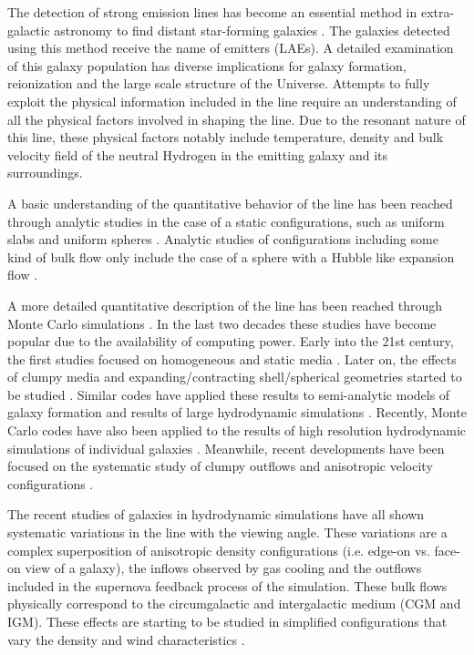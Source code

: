 \documentclass{emulateapj}
\newcommand{\ly}{{\ifmmode{{\rm Ly}\alpha~}\else{Ly$\alpha$~}\fi}}
\begin{document}
The detection of strong \ly emission lines has become an essential
method in extra-galactic astronomy to find distant star-forming
galaxies
\citep{PartridgePeebles,Rhoads00,Gawiser2007,Koehler2007,Ouchi08,Yamada2012,Schenker2012,Finkelstein2013}.
The galaxies detected using this method receive the 
name of \ly emitters (LAEs). 
A detailed examination of this galaxy population has diverse
implications for galaxy formation, reionization and the large scale
structure of the Universe.  
Attempts to fully exploit the physical information included in the \ly
line require an understanding of all the physical factors involved in
shaping the  line. 
Due to the resonant nature of this line, these physical factors
notably include temperature, density and bulk velocity field of the
neutral Hydrogen in the emitting galaxy and its surroundings.


A basic understanding of the quantitative behavior of the \ly line
has been reached through analytic studies in the case of a static
configurations, such as uniform slabs
\citep{Adams72,Harrington73,Neufeld90} and uniform spheres
\citep{Dijkstra06}. 
Analytic studies of configurations including some kind of bulk flow
only include the case of a sphere with a Hubble like expansion flow
\citep{LoebRybicki}.  

A more detailed quantitative description of the \ly line has been
reached through Monte Carlo simulations \citep{Auer68,Avery68,Adams72}. 
In the last two decades these studies have become popular due to the
availability of computing power. 
Early into the 21st century, the first
studies focused on homogeneous and static media
\citep{Ahn00,Ahn01,Zheng02}. 
Later on, the effects of clumpy media \citep{Hansen06} and
expanding/contracting shell/spherical geometries started to be studied
\citep{Ahn03,Verhamme06,Dijkstra06}.  
Similar codes have applied these results to semi-analytic models of
galaxy formation \citep{Orsi12, Garel2012} and results of large
hydrodynamic simulations \citep{CLARA,Forero12,Behrens13}. 
Recently, Monte Carlo codes have also been applied to the results of
high resolution hydrodynamic simulations of individual galaxies
\citep{Laursen09,Barnes11,Verhamme12,Yajima12}. 
Meanwhile, recent  developments have been focused on the systematic
study of clumpy outflows \citep{DijkstraKramer} and anisotropic
velocity configurations \citep{Zheng2013}. 

The recent studies of galaxies in hydrodynamic simulations
\citep{Laursen09,Barnes11,Verhamme12,Yajima12} have all shown
systematic variations in the \ly line with the viewing angle. These
variations are a complex superposition of anisotropic density
configurations (i.e. edge-on vs. face-on view of a galaxy), the
inflows observed by gas cooling and the outflows included in the
supernova feedback process of the simulation. These bulk flows
physically correspond to the circumgalactic and intergalactic medium
(CGM and IGM). These effects are starting to be studied
 in simplified configurations that vary the density and wind
 characteristics \citep{Zheng2013,Behrens2014}. 
\end{document}
